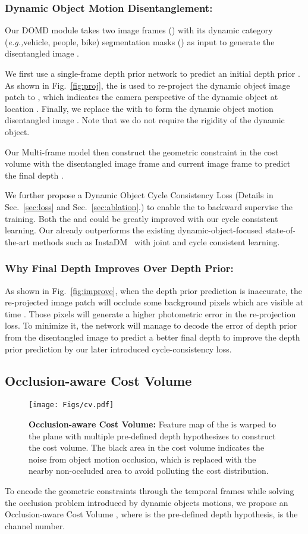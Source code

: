 \documentclass[runningheads]{llncs}
\newcommand{\eg}{\textit{e.g.,}}
\begin{document}
\subsubsection{Dynamic Object Motion Disentanglement: }
Our DOMD module  takes two image frames () with its dynamic category (\eg vehicle, people, bike) segmentation masks () as input to generate the disentangled image .


We first use a single-frame depth prior network  to predict an initial depth prior . As shown in Fig.~\ref{fig:proj}, the  is used to re-project the dynamic object image patch  to , which indicates the  camera perspective of the dynamic object at location . Finally, we replace the  with  to form the dynamic object motion disentangled image . Note that we do not require the rigidity of the dynamic object.



Our Multi-frame model  then construct the geometric constraint in the cost volume with the disentangled image frame  and current image frame  to predict the final depth .

We further propose a Dynamic Object Cycle Consistency Loss  (Details in Sec.~\ref{sec:loss} and Sec.~\ref{sec:ablation}.) to enable the  to backward supervise the  training. Both the  and  could be greatly improved with our cycle consistent learning. Our  already outperforms the existing dynamic-object-focused state-of-the-art methods such as InstaDM~\cite{instadm} with joint and cycle consistent learning.

\subsubsection{Why Final Depth Improves Over Depth Prior:}
As shown in Fig.~\ref{fig:improve}, when the depth prior prediction is inaccurate, the re-projected image patch  will occlude some background pixels which are visible at time . Those pixels will generate a higher photometric error in the re-projection loss. To minimize it, the network will manage to decode the error of depth prior from the disentangled image  to predict a better final depth to improve the depth prior prediction by our later introduced cycle-consistency loss.


\subsection{Occlusion-aware Cost Volume}
\label{sec:cv}
\begin{figure*}[t]
\centering
\texttt{[image: Figs/cv.pdf]}
\caption{ \textbf{Occlusion-aware Cost Volume: }Feature map  of the  is warped to the  plane with multiple pre-defined depth hypothesizes  to construct the cost volume. The black area in the cost volume indicates the noise from object motion occlusion, which is replaced with the nearby non-occluded area to avoid polluting the cost distribution.}
\label{fig:cv}
\end{figure*}
To encode the geometric constraints through the temporal frames while solving the occlusion problem introduced by dynamic objects motions, we propose an Occlusion-aware Cost Volume , where  is the pre-defined depth hypothesis,  is the channel number.
\end{document}
